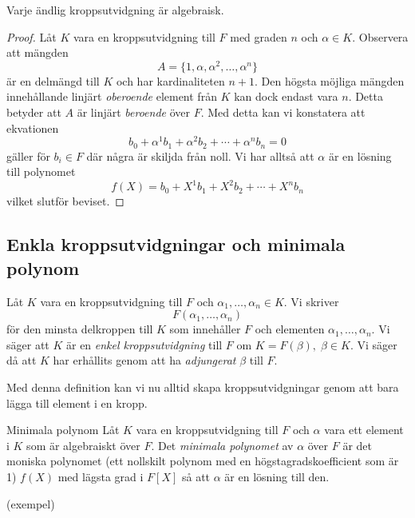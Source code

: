 \documentclass{article}
\theoremstyle{definition}
\begin{document}
\hypertarget{algebraiskkropp}{}
\begin{mylemma}{}{}
  Varje ändlig kroppsutvidgning är algebraisk.
\end{mylemma}

\begin{proof}
  Låt $K$ vara en kroppsutvidgning till $F$ med graden $n$ och $\alpha \in K$. Observera att mängden
  \[A = \{1, \alpha, \alpha^2, \ldots, \alpha^n\} \]
  är en delmängd till $K$ och har kardinaliteten $n+1$. Den högsta möjliga mängden innehållande linjärt \textit{oberoende} element från $K$ kan dock endast vara $n$. 
  Detta betyder att $A$ är linjärt \textit{beroende} över $F$. Med detta kan vi konstatera att ekvationen
  \[b_0 + \alpha^1 b_1 + \alpha^2 b_2 + \cdots + \alpha^n b_n = 0\]
  gäller för $b_i \in F$ där några är skiljda från noll. Vi har alltså att $\alpha$ är en lösning till polynomet 
  \[f(X) = b_0 + X^1 b_1 + X^2 b_2 + \cdots + X^n b_n\]
  vilket slutför beviset.
\end{proof}

\subsection{Enkla kroppsutvidgningar och minimala polynom}
\begin{mydef}{}{}
  Låt $K$ vara en kroppsutvidgning till $F$ och $\alpha_1, \ldots, \alpha_n \in K$. Vi skriver  
  \[F(\alpha_1, \ldots, \alpha_n)\]
  för den minsta delkroppen till $K$ som innehåller $F$ och elementen $\alpha_1, \ldots, \alpha_n$. Vi säger att $K$ är en \textit{enkel kroppsutvidgning} till $F$
  om $K = F(\beta), \; \beta \in K.$ Vi säger då att $K$ har erhållits genom att ha \textit{adjungerat} $\beta$ till $F$.
\end{mydef}
Med denna definition kan vi nu alltid skapa kroppsutvidgningar genom att bara lägga till element i en kropp. 

\begin{mydef}{Minimala polynom}{}
  Låt $K$ vara en kroppsutvidgning till $F$ och $\alpha$ vara ett element i $K$ som är algebraiskt över $F$. Det \textit{minimala polynomet} av $\alpha$ över $F$
  är det moniska polynomet (ett nollskilt polynom med en högstagradskoefficient som är 1) $f(X)$ med lägsta grad i $F[X]$ så att $\alpha$ är en lösning till den. 
\end{mydef}
(exempel)
\end{document}
